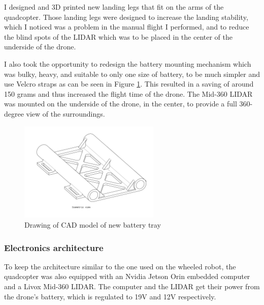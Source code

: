 \documentclass[12pt]{article}
\begin{document}
                I designed and 3D printed new landing legs that fit on the arms of the quadcopter. Those landing legs were designed to increase the landing stability, which I noticed was a problem in the manual flight I performed, and to reduce the blind spots of the LIDAR which was to be placed in the center of the underside of the drone.

                I also took the opportunity to redesign the battery mounting mechanism which was bulky, heavy, and suitable to only one size of battery, to be much simpler and use Velcro straps as can be seen in Figure \ref{fig:landing_legs}. This resulted in a saving of around 150 grams and thus increased the flight time of the drone. The Mid-360 LIDAR was mounted on the underside of the drone, in the center, to provide a full 360-degree view of the surroundings. 
                

                \begin{figure}[H]
                    \centering
                    \includegraphics[width=0.6\textwidth]{Images/BatteryTrayDrawing.pdf}
                    \caption{Drawing of CAD model of new battery tray}
                    \label{fig:landing_legs}
                \end{figure}    
            \subsubsection{Electronics architecture}


                To keep the architecture similar to the one used on the wheeled robot, the quadcopter was also equipped with an Nvidia Jetson Orin embedded computer and a Livox Mid-360 LIDAR. The computer and the LIDAR get their power from the drone's battery, which is regulated to 19V and 12V respectively.
\end{document}
